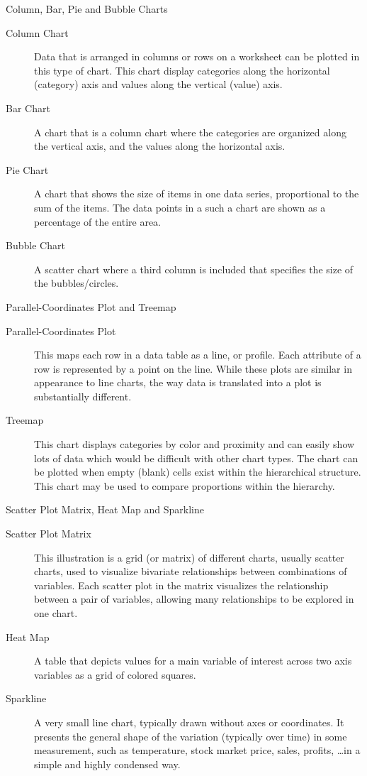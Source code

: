 \documentclass[pdf]{beamer}
\theoremstyle{remark}
\theoremstyle{definition}
\begin{document}
\begin{frame}[t]{Column, Bar, Pie and Bubble Charts}
\begin{description}
\item [Column Chart] Data that is arranged in columns or rows on a worksheet can be plotted in this type of  chart. This chart display categories along the horizontal (category) axis and values along the vertical (value) axis.
\item [Bar Chart] A chart that is a column chart where the categories are organized along the vertical axis, and the values along the horizontal axis.
\item [Pie Chart]  A chart that shows the size of items in one data series, proportional to the sum of the items. The data points in a such a chart are shown as a percentage of the entire area.
\item [Bubble Chart] A scatter chart where a third column is included that specifies the size of the bubbles/circles. 
\end{description}
\end{frame}

\begin{frame}[t]{Parallel-Coordinates Plot and Treemap}
\begin{description}
\item [Parallel-Coordinates Plot] This maps each row in a data table as a line, or profile. Each attribute of a row is represented by a point on the line. While these plots are similar in appearance to line charts, the way data is translated into a plot is substantially different.
\item [Treemap] This chart displays categories by color and proximity and can easily show lots of data which would be difficult with other chart types. The chart can be plotted when empty (blank) cells exist within the hierarchical structure.  This chart may be used to compare proportions within the hierarchy.
\end{description}
\end{frame}

\begin{frame}[t]{Scatter Plot Matrix, Heat Map and Sparkline}
\begin{description}
\item [Scatter Plot Matrix] This illustration is a grid (or matrix) of different charts, usually scatter charts, used to visualize bivariate relationships between combinations of variables. Each scatter plot in the matrix visualizes the relationship between a pair of variables, allowing many relationships to be explored in one chart.
\item [Heat Map] A table that depicts values for a main variable of interest across two axis variables as a grid of colored squares.
\item [Sparkline] A  very small line chart, typically drawn without axes or coordinates. It presents the general shape of the variation (typically over time) in some measurement, such as temperature, stock market price, sales, profits, \ldots in a simple and highly condensed way. 
\end{description}
\end{frame}
\end{document}
